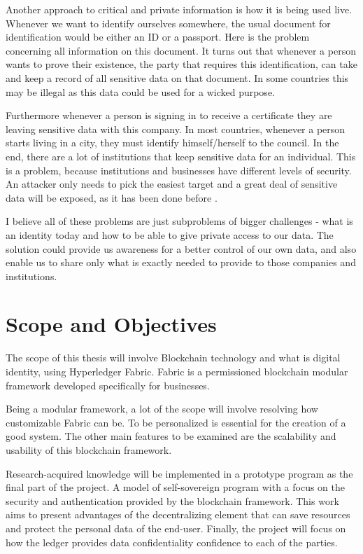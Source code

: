 \documentclass[a4paper,11pt]{report}
\begin{document}
		Another approach to critical and private information is how it is being used live. Whenever we want to identify ourselves somewhere, the usual document for identification would be either an ID or a passport. Here is the problem concerning all information on this document. It turns out that whenever a person wants to prove their existence, the party that requires this identification, can take and keep a record of all sensitive data on that document. In some countries this may be illegal as this data could be used for a wicked purpose. \cite{alboaie2017private}
		
Furthermore whenever a person is signing in to receive a certificate they are leaving sensitive data with this company. In most countries, whenever a person starts living in a city, they must identify himself/herself to the council. In the end, there are a lot of institutions that keep sensitive data for an individual. This is a problem, because institutions and businesses have different levels of security. An attacker only needs to pick the easiest target and a great deal of sensitive data will be exposed, as it has been done before \cite{breaches}.

	I believe all of these problems are just  subproblems of bigger challenges - what is an identity today and how to be able to give private access to our data. The solution could provide us awareness for a better control of our own data, and also enable us to share only what is exactly needed to provide to those companies and institutions.

\section{Scope and Objectives}

\label{introduction-objectives}

The scope of this thesis will involve Blockchain technology and what is digital identity, using Hyperledger Fabric. Fabric is a permissioned blockchain modular framework developed specifically for businesses.
 
Being a modular framework, a lot of the scope will involve resolving how customizable Fabric can be. To be personalized is essential for the creation of a good system. The other main features to be examined are the scalability and usability of this blockchain framework.   

Research-acquired knowledge will be implemented in a prototype program as the final part of the project. A model of self-sovereign program  with a focus on the security and authentication provided by the blockchain framework. This work aims to present advantages of the decentralizing element that can save resources and protect the personal data of the end-user. Finally, the project will focus on how the ledger provides data confidentiality confidence to each of the parties. 
 	
\end{document}
